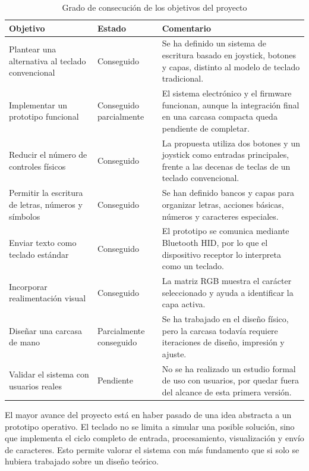 \begin{table}[H]
    \centering
    \caption{Grado de consecución de los objetivos del proyecto}
    \label{tab:consecucion-objetivos}
    \begin{tabularx}{\textwidth}{@{}p{}p{}X@{}}
        \toprule
        \textbf{Objetivo} & \textbf{Estado} & \textbf{Comentario} \\
        \midrule
        Plantear una alternativa al teclado convencional & Conseguido & Se ha definido un sistema de escritura basado en joystick, botones y capas, distinto al modelo de teclado tradicional. \\
        Implementar un prototipo funcional & Conseguido parcialmente & El sistema electrónico y el firmware funcionan, aunque la integración final en una carcasa compacta queda pendiente de completar. \\
        Reducir el número de controles físicos & Conseguido & La propuesta utiliza dos botones y un joystick como entradas principales, frente a las decenas de teclas de un teclado convencional. \\
        Permitir la escritura de letras, números y símbolos & Conseguido & Se han definido bancos y capas para organizar letras, acciones básicas, números y caracteres especiales. \\
        Enviar texto como teclado estándar & Conseguido & El prototipo se comunica mediante Bluetooth HID, por lo que el dispositivo receptor lo interpreta como un teclado. \\
        Incorporar realimentación visual & Conseguido & La matriz RGB muestra el carácter seleccionado y ayuda a identificar la capa activa. \\
        Diseñar una carcasa de mano & Parcialmente conseguido & Se ha trabajado en el diseño físico, pero la carcasa todavía requiere iteraciones de diseño, impresión y ajuste. \\
        Validar el sistema con usuarios reales & Pendiente & No se ha realizado un estudio formal de uso con usuarios, por quedar fuera del alcance de esta primera versión. \\
        \bottomrule
    \end{tabularx}
\end{table}

El mayor avance del proyecto está en haber pasado de una idea abstracta a un prototipo operativo. El teclado no se limita a simular una posible solución, sino que implementa el ciclo completo de entrada, procesamiento, visualización y envío de caracteres. Esto permite valorar el sistema con más fundamento que si solo se hubiera trabajado sobre un diseño teórico.

